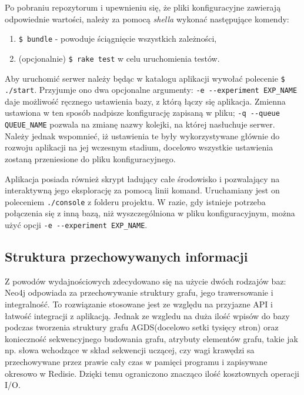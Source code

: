 Po pobraniu repozytorum i upewnieniu się, że pliki konfiguracyjne zawierają odpowiednie wartości, należy za pomocą \emph{shella} wykonać następujące komendy:
\begin{enumerate}
\item \texttt{\$ bundle} - powoduje ściągnięcie wszystkich zależności,
\item (opcjonalnie) \texttt{\$ rake test} w celu uruchomienia testów.
\end{enumerate}

Aby uruchomić serwer należy będąc w katalogu aplikacji wywołać polecenie \texttt{\$ ./start}. Przyjumje ono dwa opcjonalne argumenty: \texttt{-e -\--experiment EXP\_NAME} daje możliwość
ręcznego ustawienia bazy, z którą łączy się aplikacja. Zmienna ustawiona w ten sposób nadpisze konfigurację zapisaną w pliku; \texttt{-q -\--queue QUEUE\_NAME} pozwala na zmianę nazwy
kolejki, na której nasłuchuje serwer. Należy jednak wspomnieć, iż ustawienia te były wykorzystywane głównie do rozwoju aplikacji na jej wczesnym stadium, docelowo wszystkie ustawienia
zostaną przeniesione do pliku konfiguracyjnego.

Aplikacja posiada również skrypt ładujący całe środowisko i pozwalający na interaktywną jego eksplorację za pomocą linii komand. Uruchamiany jest on poleceniem \texttt{./console} z
folderu projektu. W razie, gdy istnieje potrzeba połączenia się z inną bazą, niż wyszczególniona w pliku konfiguracyjnym, można użyć opcji \texttt{-e -\--experiment EXP\_NAME}.

\subsection{Struktura przechowywanych informacji}
\label{subs:struktNeo4j}

Z powodów wydajnościowych zdecydowano się na użycie dwóch rodzajów baz: Neo4j odpowiada za przechowywanie struktury grafu,
jego trawersowanie i integralność. To rozwiązanie stosowane jest ze względu na przyjazne API i łatwość integracji z aplikacją. Jednak ze wzgledu na duża ilość wpisów do bazy
podczas tworzenia struktury grafu AGDS(docelowo setki tysięcy stron) oraz konieczność sekwencyjnego budowania grafu, atrybuty elementów grafu, takie jak np. słowa wchodzące
w skład sekwencji uczącej, czy wagi krawędzi sa przechowywane przez prawie cały czas w pamięci programu i zapisywane okresowo w Redisie. Dzięki temu ograniczono znacząco ilość
kosztownych operacji I/O.

